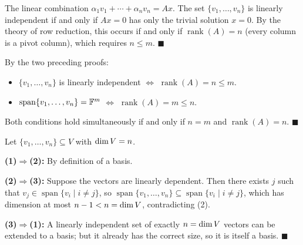 \begin{proofbox}
The linear combination $\alpha_1 v_1+\cdots+\alpha_n v_n = Ax$.
The set $\{v_1,\ldots,v_n\}$ is linearly independent if and only if
$Ax=0$ has only the trivial solution $x=0$.  By the theory of row
reduction, this occurs if and only if $\operatorname{rank}(A)=n$
(every column is a pivot column), which requires $n\le m$.
\hfill$\blacksquare$
\end{proofbox}

\begin{proofbox}
By the two preceding proofs:
\begin{itemize}
    \item $\{v_1,\ldots,v_n\}$ is linearly independent $\Leftrightarrow$
          $\operatorname{rank}(A)=n\le m$.
    \item $\operatorname{span}\{v_1,\ldots,v_n\}=\mathbb{F}^m$ $\Leftrightarrow$
          $\operatorname{rank}(A)=m\le n$.
\end{itemize}
Both conditions hold simultaneously if and only if $n=m$ and
$\operatorname{rank}(A)=n$. \hfill$\blacksquare$
\end{proofbox}

\begin{proofbox}
Let $\{v_1,\ldots,v_n\}\subseteq V$ with $\operatorname{dim} V=n$.

\medskip\noindent
\textbf{(1)$\Rightarrow$(2):} By definition of a basis.

\medskip\noindent
\textbf{(2)$\Rightarrow$(3):} Suppose the vectors are linearly dependent.
Then there exists $j$ such that
$v_j\in\operatorname{span}\{v_i\mid i\neq j\}$, so
$\operatorname{span}\{v_1,\ldots,v_n\}\subseteq
 \operatorname{span}\{v_i\mid i\neq j\}$,
which has dimension at most $n-1<n=\operatorname{dim} V$, contradicting (2).

\medskip\noindent
\textbf{(3)$\Rightarrow$(1):} A linearly independent set of exactly
$n=\operatorname{dim} V$ vectors can be extended to a basis; but it already has the
correct size, so it is itself a basis. \hfill$\blacksquare$
\end{proofbox}

